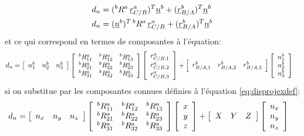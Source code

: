 \begin{align}
	d_n &= ( {}^bR^a \, \underline{r}_{C/B}^a )^T \underline{n}^b + ( \underline{r}_{B/A}^b )^T \underline{n}^b \\
	d_n &= ( \underline{n}^b )^T \, {}^bR^a \, \underline{r}_{C/B}^a + ( \underline{r}_{B/A}^b )^T \underline{n}^b
\end{align}
et ce qui correspond en termes de composantes à l'équation:
\begin{align}
	d_n &= \left[ \begin{array}{c c c}
					  n_1^b & n_2^b & n_3^b
	\end{array}  \right]
	\left[ \begin{array}{c c c}
	{}^bR^a_{11} & {}^bR^a_{12} & {}^bR^a_{13} \\
	{}^bR^a_{21} & {}^bR^a_{22} & {}^bR^a_{23} \\
	{}^bR^a_{31} & {}^bR^a_{32} & {}^bR^a_{33}
	\end{array}  \right]
	\left[ \begin{array}{c} r_{C/B,1}^a \\ r_{C/B,2}^a \\ r_{C/B,3}^a  \end{array} \right]
	+
	\left[ \begin{array}{c c c}
			   r_{B/A,1}^b & r_{B/A,2}^b & r_{B/A,3}^b
	\end{array}  \right]
	\left[ \begin{array}{c} n_1^b \\ n_2^b \\ n_3^b  \end{array} \right]
\end{align}
si on substitue par les composantes connues définies à l'équation \eqref{eq:disprojexdef}:
\begin{align}
	d_n &=
	\left[ \begin{array}{c c c}
			   n_x & n_y & n_z
	\end{array}  \right]
	\left[ \begin{array}{c c c}
	{}^bR^a_{11} & {}^bR^a_{12} & {}^bR^a_{13} \\
	{}^bR^a_{21} & {}^bR^a_{22} & {}^bR^a_{23} \\
	{}^bR^a_{31} & {}^bR^a_{32} & {}^bR^a_{33}
	\end{array}  \right]
	\left[ \begin{array}{c} x \\ y \\ z  \end{array} \right]
	+
	\left[ \begin{array}{c c c}
			   X & Y & Z
	\end{array}  \right]
	\left[ \begin{array}{c} n_x \\ n_y \\ n_z  \end{array} \right]
\end{align}
